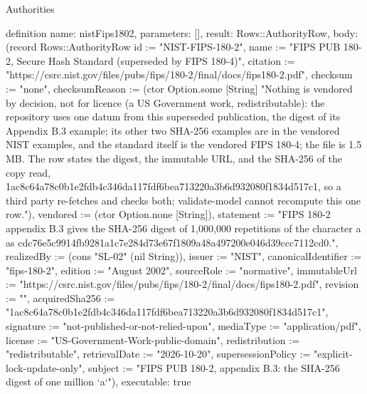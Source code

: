 \begin{lexlean}{Authorities}
\begin{semanticmodule}
definition{
  name: nistFips1802,
  parameters: [],
  result: Rows::AuthorityRow,
  body: (record Rows::AuthorityRow {id := "NIST-FIPS-180-2", name := "FIPS PUB 180-2, Secure Hash Standard (superseded by FIPS 180-4)", citation := "https://csrc.nist.gov/files/pubs/fips/180-2/final/docs/fips180-2.pdf", checksum := "none", checksumReason := (ctor Option.some [String] "Nothing is vendored by decision, not for licence (a US Government work, redistributable): the repository uses one datum from this superseded publication, the digest of its Appendix B.3 example; its other two SHA-256 examples are in the vendored NIST examples, and the standard itself is the vendored FIPS 180-4; the file is 1.5 MB. The row states the digest, the immutable URL, and the SHA-256 of the copy read, 1ac8c64a78c0b1e2fdb4c346da117fdf6bea713220a3b6d932080f1834d517c1, so a third party re-fetches and checks both; validate-model cannot recompute this one row."), vendored := (ctor Option.none [String]), statement := "FIPS 180-2 appendix B.3 gives the SHA-256 digest of 1,000,000 repetitions of the character a as cdc76e5c9914fb9281a1c7e284d73e67f1809a48a497200e046d39ccc7112cd0.", realizedBy := (cons "SL-02" (nil String)), issuer := "NIST", canonicalIdentifier := "fips-180-2", edition := "August 2002", sourceRole := "normative", immutableUrl := "https://csrc.nist.gov/files/pubs/fips/180-2/final/docs/fips180-2.pdf", revision := "", acquiredSha256 := "1ac8c64a78c0b1e2fdb4c346da117fdf6bea713220a3b6d932080f1834d517c1", signature := "not-published-or-not-relied-upon", mediaType := "application/pdf", license := "US-Government-Work-public-domain", redistribution := "redistributable", retrievalDate := "2026-10-20", supersessionPolicy := "explicit-lock-update-only", subject := "FIPS PUB 180-2, appendix B.3: the SHA-256 digest of one million `a`"}),
  executable: true
}


\end{semanticmodule}
\end{lexlean}
